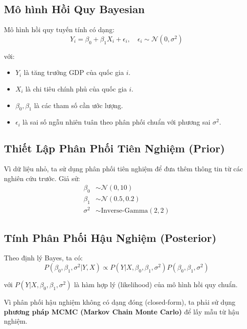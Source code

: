    \subsection{Mô hình Hồi Quy Bayesian}
   Mô hình hồi quy tuyến tính có dạng:
   \begin{equation}
       Y_i = \beta_0 + \beta_1 X_i + \epsilon_i, \quad \epsilon_i \sim \mathcal{N}(0, \sigma^2)
   \end{equation}
   
   với:
   \begin{itemize}
       \item $Y_i$ là tăng trưởng GDP của quốc gia $i$.
       \item $X_i$ là chi tiêu chính phủ của quốc gia $i$.
       \item $\beta_0, \beta_1$ là các tham số cần ước lượng.
       \item $\epsilon_i$ là sai số ngẫu nhiên tuân theo phân phối chuẩn với phương sai $\sigma^2$.
   \end{itemize}
   
   \subsection{Thiết Lập Phân Phối Tiên Nghiệm (Prior)}
   Vì dữ liệu nhỏ, ta sử dụng phân phối tiên nghiệm để đưa thêm thông tin từ các nghiên cứu trước. Giả sử:
   \begin{align*}
       \beta_0 &\sim \mathcal{N}(0, 10) \\
       \beta_1 &\sim \mathcal{N}(0.5, 0.2) \\
       \sigma^2 &\sim \text{Inverse-Gamma}(2, 2)
   \end{align*}
   
   \subsection{Tính Phân Phối Hậu Nghiệm (Posterior)}
   Theo định lý Bayes, ta có:
   \begin{equation}
       P(\beta_0, \beta_1, \sigma^2 | Y, X) \propto P(Y | X, \beta_0, \beta_1, \sigma^2) P(\beta_0, \beta_1, \sigma^2)
   \end{equation}
   
   với $P(Y | X, \beta_0, \beta_1, \sigma^2)$ là hàm hợp lý (likelihood) của mô hình hồi quy chuẩn.
   
   Vì phân phối hậu nghiệm không có dạng đóng (closed-form), ta phải sử dụng \textbf{phương pháp MCMC (Markov Chain Monte Carlo)} để lấy mẫu từ hậu nghiệm.
   
